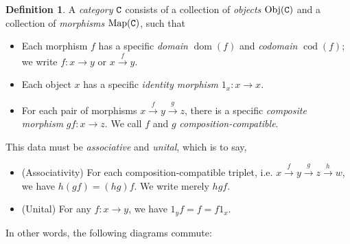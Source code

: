 \documentclass[11 pt]{amsart}
\theoremstyle{plain}   %
\theoremstyle{definition}
\newtheorem{defn}{Definition}[section]
\theoremstyle{remark}
\numberwithin{equation}{section}
\DeclareMathOperator{\dom}{dom}
\DeclareMathOperator{\cod}{cod}
\newcommand{\punctuation}[1]{\makebox[0pt][l]{#1}}
\newcommand{\cat}[1]{{\normalfont\texttt{#1}}}
\newcommand{\Obj}[1]{\text{Obj}(\cat{#1})}
\newcommand{\Map}[1]{\text{Map}(\cat{#1})}
\begin{document}
\begin{defn}
	A \emph{category} $\cat{C}$ consists of a collection of \emph{objects} $\Obj{C}$
	and a collection of \emph{morphisms} $\Map{C}$, such that

	\begin{itemize}
		\item Each morphism $f$ has a specific \emph{domain} $\dom(f)$ and
		      \emph{codomain} $\cod(f)$; we write $f: x\rightarrow y$ or
		      $x\xrightarrow{f} y$.
		\item Each object $x$ has a specific \emph{identity morphism} $1_x:
			      x\rightarrow x$.
		\item For each pair of morphisms $x\xrightarrow{f} y\xrightarrow{g}
			      z$, there is a specific \emph{composite morphism} $gf:
			      x\rightarrow z$. We call $f$ and $g$ \emph{composition-compatible}.
	\end{itemize}
	This data must be \emph{associative} and \emph{unital}, which is to say,
	\begin{itemize}
		\item (Associativity) For each composition-compatible triplet, i.e.
		      $x\xrightarrow{f}y \xrightarrow{g}z\xrightarrow{h}w$, we have $h(gf) =
			      (hg)f$. We write merely $hgf$.
		\item (Unital) For any $f: x\rightarrow y$, we have $1_yf = f = f1_x$.
	\end{itemize}

	In other words, the following diagrams commute:

	\begin{figure}[H]
		\centering
		\begin{multicols}{2}

		\end{multicols}
	\end{figure}
\end{defn}
\end{document}
